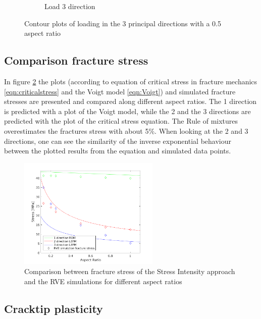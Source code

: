 \begin{figure}
\begin{subfigure}[b]{0.5\textwidth}
    \caption{ Load 3 direction}
  \end{subfigure}
  \caption{Contour plots of loading in the 3 principal directions with a 0.5 aspect ratio}
  \label{fig:contour3}
\end{figure}

\subsection{Comparison fracture stress}
In figure \ref{fig:fracturestress} the plots (according to equation of critical stress in fracture mechanics \ref{eqn:criticalstress} and the Voigt model \ref{eqn:Voigt}) and simulated fracture stresses are presented and compared along different aspect ratios. The 1 direction is predicted with a plot of the Voigt model, while the 2 and the 3 directions are predicted with the plot of the critical stress equation. The Rule of mixtures overestimates the fractures stress with about 5\%. 
When looking at the 2 and 3 directions, one can see the similarity of the inverse exponential behaviour between the plotted results from the equation and simulated data points. 


\begin{figure}[H]
    \centering
    \includegraphics[width=0.60\textwidth]{chapter_7_non-elasticmodelling/figures/yieldstress.png}
    \caption{Comparison between fracture stress of the Stress Intensity approach and the RVE simulations for different aspect ratios}
    \label{fig:fracturestress}
\end{figure}
\subsection{Cracktip plasticity}

